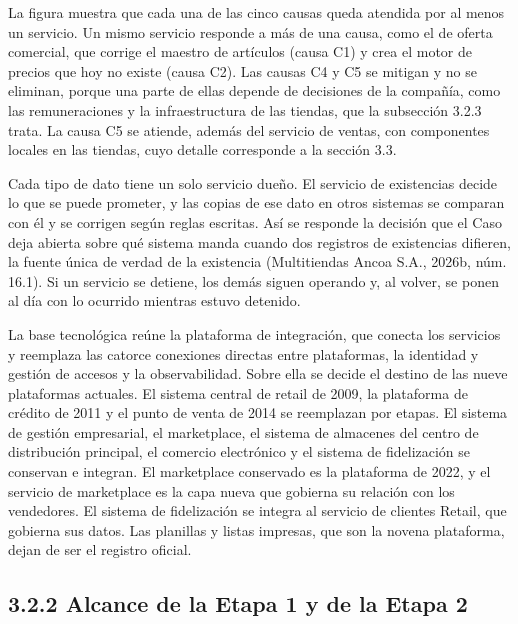 \documentclass[11pt]{article}
\begin{document}
La figura muestra que cada una de las cinco causas queda atendida por al menos un servicio. Un mismo servicio responde a más de una causa, como el de oferta comercial, que corrige el maestro de artículos (causa C1) y crea el motor de precios que hoy no existe (causa C2). Las causas C4 y C5 se mitigan y no se eliminan, porque una parte de ellas depende de decisiones de la compañía, como las remuneraciones y la infraestructura de las tiendas, que la subsección 3.2.3 trata. La causa C5 se atiende, además del servicio de ventas, con componentes locales en las tiendas, cuyo detalle corresponde a la sección 3.3.

Cada tipo de dato tiene un solo servicio dueño. El servicio de existencias decide lo que se puede prometer, y las copias de ese dato en otros sistemas se comparan con él y se corrigen según reglas escritas. Así se responde la decisión que el Caso deja abierta sobre qué sistema manda cuando dos registros de existencias difieren, la fuente única de verdad de la existencia (Multitiendas Ancoa S.A., 2026b, núm. 16.1). Si un servicio se detiene, los demás siguen operando y, al volver, se ponen al día con lo ocurrido mientras estuvo detenido.

La base tecnológica reúne la plataforma de integración, que conecta los servicios y reemplaza las catorce conexiones directas entre plataformas, la identidad y gestión de accesos y la observabilidad. Sobre ella se decide el destino de las nueve plataformas actuales. El sistema central de retail de 2009, la plataforma de crédito de 2011 y el punto de venta de 2014 se reemplazan por etapas. El sistema de gestión empresarial, el marketplace, el sistema de almacenes del centro de distribución principal, el comercio electrónico y el sistema de fidelización se conservan e integran. El marketplace conservado es la plataforma de 2022, y el servicio de marketplace es la capa nueva que gobierna su relación con los vendedores. El sistema de fidelización se integra al servicio de clientes Retail, que gobierna sus datos. Las planillas y listas impresas, que son la novena plataforma, dejan de ser el registro oficial.


\subsection{3.2.2 Alcance de la Etapa 1 y de la Etapa 2}
\end{document}

